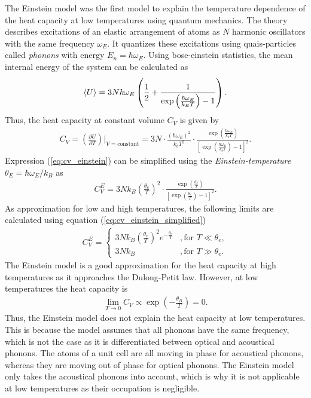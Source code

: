 The Einstein model was the first model to explain the temperature dependence of the heat capacity at low temperatures using quantum mechanics.
The theory describes excitations of an elastic arrangement of atoms as $N$ harmonic oscillators with the same frequency $\omega_E$.
It quantizes these excitations using quais-particles called \textit{phonons} with energy $E_n = \hbar\omega_E$.
Using bose-einstein statistics, the mean internal energy of the system can be calculated as
\begin{align}
    \braket U=3N\hbar\omega_E\left( \frac12+\frac1{\exp\left(\frac{\hbar\omega_E}{k_BT}\right)-1}\right).
    \label{eq:U_einstein}
\end{align}
Thus, the heat capacity at constant volume $C_V$ is given by
\begin{align}
    C_V=\left(\frac{\partial U}{\partial T}\right)\Big|_{V=\text{constant}} = 3N\cdot\frac{(\hbar\omega_E)^2}{k_bT^2}\cdot\frac{\exp\left(\frac{\hbar\omega_E}{k_bT}\right)}{\left[\exp\left(\frac{\hbar\omega_E}{k_bT}\right)-1\right]^2}.
    \label{eq:cv_einstein}
\end{align}
Expression (\ref{eq:cv_einstein}) can be simplified using the \textit{Einstein-temperature} $\theta_E=\hbar\omega_E/k_B$ as
\begin{align}
    C_V^E=3Nk_B\left(\frac{\theta_e}{T}\right)^2 \cdot 
    \frac{\exp\left(\frac{\theta_e}{T}\right)}{\left[\exp\left(\frac{\theta_e}{T}\right)-1\right]^2}.
    \label{eq:cv_einstein_simplified}
\end{align}
As approximation for low and high temperatures, the following limits are calculated using equation (\ref{eq:cv_einstein_simplified})
\begin{align}
    C_V^E=\begin{cases}
        3Nk_B\left(\frac{\theta_e}{T}\right)^2e^{-\frac{\theta_e}{T}} &,\text{for } T\ll\theta_e, \\
        3Nk_B &,\text{for } T\gg\theta_e.
        \end{cases}
    \label{eq:cv_einstein_limits}
\end{align}
The Einstein model is a good approximation for the heat capacity at high temperatures as it approaches the Dulong-Petit law.
However, at low temperatures the heat capacity is 
\begin{align}
    \lim_{T \to 0}C_V\propto \exp(-\frac{\theta_B}{T}) =0.
    \label{eq:cv_einstein_low}
\end{align}
Thus, the Einstein model does not explain the heat capacity at low temperatures.
This is because the model assumes that all phonons have the same frequency, which is not the case as it is differentiated between optical and acoustical phonons.
The atoms of a unit cell are all moving in phase for acoustical phonons, whereas they are moving out of phase for optical phonons.
The Einstein model only takes the acoustical phonons into account, which is why it is not applicable at low temperatures as their occupation is negligible. %

